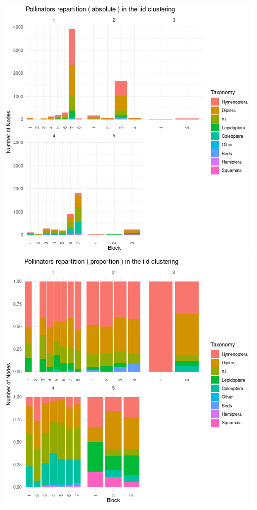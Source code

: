 \includegraphics{figure/iid_plot_taxonomy_pollinators-1.png}\includegraphics{figure/iid_plot_taxonomy_pollinators-2.png}

